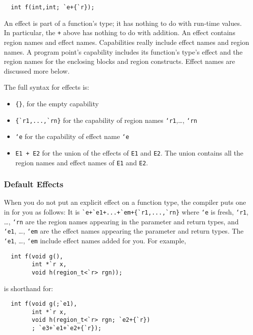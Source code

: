 \begin{verbatim}
  int f(int,int; `e+{`r});
\end{verbatim}

An effect is part of a function's type; it has nothing to do with
run-time values.  In particular, the \texttt{+} above has nothing to do
with addition.  An effect contains region names and effect names.
Capabilities really include effect names and region names.  A program
point's capability includes its function's type's effect and the
region names for the enclosing blocks and region constructs.
Effect names are discussed more below.

The full syntax for effects is:

\begin{itemize}
\item \verb|{}|, for the empty capability 
\item \verb|{`r1,...,`rn}| for the capability of region names
  \texttt{`r1},\ldots, \texttt{`rn} 
\item \texttt{`e} for the capability of effect name \texttt{`e} 
\item \texttt{E1 + E2} for the union of the effects of \texttt{E1} and
  \texttt{E2}.  The union contains all the region names and effect names
  of \texttt{E1} and \texttt{E2}. 
\end{itemize}

\subsubsection{Default Effects}

When you do not put an explicit effect on a function type, the
compiler puts one in for you as follows: It is
\verb|`e+`e1+...+`em+{`r1,...,`rn}| where \texttt{`e} is fresh,
\texttt{`r1}, \ldots, \texttt{`rn} are the region names appearing in the
parameter and return types, and \texttt{`e1}, \ldots, \texttt{`em} are the
effect names appearing the parameter and return types.  The
\texttt{`e1}, \ldots, \texttt{`em} include effect names added for you.
For example,
\begin{verbatim}
  int f(void g(), 
        int *`r x, 
        void h(region_t<`r> rgn));
\end{verbatim}
is shorthand for:
\begin{verbatim}
  int f(void g(;`e1), 
        int *`r x, 
        void h(region_t<`r> rgn; `e2+{`r})
        ; `e3+`e1+`e2+{`r});
\end{verbatim}

